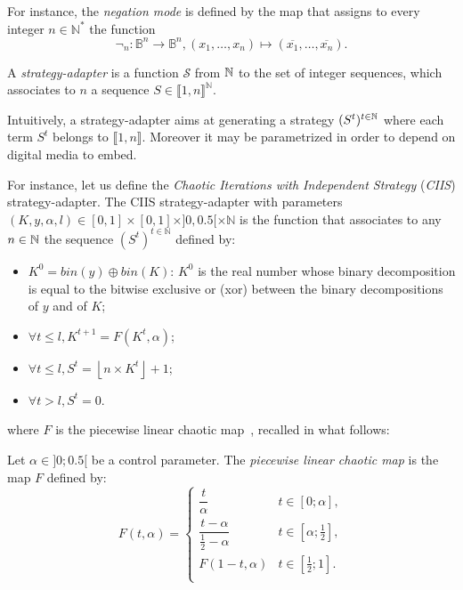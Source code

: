 \documentclass{comjnl}
\begin{document}
For instance, the \emph{negation mode} is defined by the map that
assigns to every integer $n \in \mathds{N}^*$ the function 
$${\neg}_n:\mathds{B}^n \to \mathds{B}^n, 
(x_1, \hdots, x_n) \mapsto (\overline{x_1}, \hdots, \overline{x_n}).$$



\begin{definition}
  \label{def:strategy-adapter}
  A \emph{strategy-adapter} is a function $\mathcal{S}$ 
  from $\mathbb{N}$ to the set of integer sequences, 
  which associates to $n$ a sequence 
  $S \in  \llbracket 1, n\rrbracket^\mathds{N}$.
\end{definition}

Intuitively, a strategy-adapter aims at generating a strategy 
$(S^t)^{t \in \mathbb{N}}$ where each term $S^t$ belongs to 
$\llbracket 1, n \rrbracket$. Moreover it may be parametrized
in order to depend on digital media to embed. 

For instance, let us define the  \emph{Chaotic Iterations with Independent Strategy}
(\emph{CIIS}) strategy-adapter.
The CIIS strategy-adapter with parameters 
$(K,y,\alpha,l) \in [0,1]\times [0,1] \times ]0, 0.5[ \times \mathds{N}$
is the function that associates to any  $n \in \mathbb{N}$ the sequence
$(S^t)^{t \in \mathds{N}}$ defined by: 



 \begin{itemize} 
 \item $K^0 = \textit{bin}(y) \oplus \textit{bin}(K)$: $K^0$ is the real number whose binary decomposition is equal to the bitwise exclusive or (xor)
   between the binary decompositions of $y$ and of  $K$;
 \item $\forall t \leqslant l, K^{t+1} = F(K^t,\alpha)$;
 \item $\forall t \leqslant l, S^t = \left \lfloor n \times K^t \right \rfloor + 1$;
 \item $\forall t > l, S^t = 0$.
 \end{itemize}
where $F$ is the
piecewise linear chaotic map~\cite{Shujun1}, 
recalled in what follows:

\begin{definition}
 \label{def:fonction chaotique linéaire par morceaux}
Let $\alpha \in ]0; 0.5[$ be a control parameter. 
The \emph{piecewise linear chaotic map} is the map $F$
defined by: 
 $$
 F(t,\alpha) = \left\{
 \begin{array}{cl} 
 \dfrac{t}{\alpha} & t \in [0; \alpha],\\ 
 \dfrac{t-\alpha}{\frac{1}{2}-\alpha} & t \in [\alpha;\frac{1}{2}],\\ 
 F(1-t,\alpha) & t \in [\frac{1}{2}; 1].\\ 
 \end{array}
 \right. 
 $$
 \end{definition}
\end{document}
